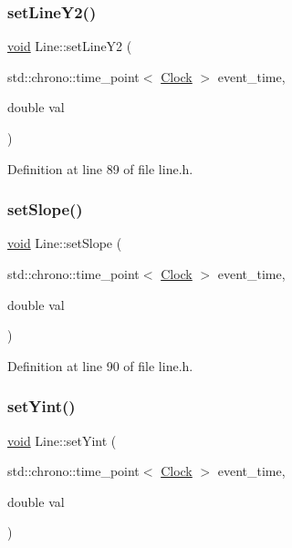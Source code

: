 \subsubsection{\texorpdfstring{set\+Line\+Y2()}{setLineY2()}}
{\footnotesize\ttfamily \mbox{\hyperlink{glad_8h_a950fc91edb4504f62f1c577bf4727c29}{void}} Line\+::set\+Line\+Y2 (\begin{DoxyParamCaption}\item[{std\+::chrono\+::time\+\_\+point$<$ \mbox{\hyperlink{universe_8h_a0ef8d951d1ca5ab3cfaf7ab4c7a6fd80}{Clock}} $>$}]{event\+\_\+time,  }\item[{double}]{val }\end{DoxyParamCaption})\hspace{0.3cm}{\ttfamily [inline]}}



Definition at line 89 of file line.\+h.

\mbox{\label{class_line_a3fb9e9eab13d146feff0bc891709eaf9}} 
\subsubsection{\texorpdfstring{set\+Slope()}{setSlope()}}
{\footnotesize\ttfamily \mbox{\hyperlink{glad_8h_a950fc91edb4504f62f1c577bf4727c29}{void}} Line\+::set\+Slope (\begin{DoxyParamCaption}\item[{std\+::chrono\+::time\+\_\+point$<$ \mbox{\hyperlink{universe_8h_a0ef8d951d1ca5ab3cfaf7ab4c7a6fd80}{Clock}} $>$}]{event\+\_\+time,  }\item[{double}]{val }\end{DoxyParamCaption})\hspace{0.3cm}{\ttfamily [inline]}}



Definition at line 90 of file line.\+h.

\mbox{\label{class_line_ad966eb3f1bd4cb29976b3e97811c344f}} 
\subsubsection{\texorpdfstring{set\+Yint()}{setYint()}}
{\footnotesize\ttfamily \mbox{\hyperlink{glad_8h_a950fc91edb4504f62f1c577bf4727c29}{void}} Line\+::set\+Yint (\begin{DoxyParamCaption}\item[{std\+::chrono\+::time\+\_\+point$<$ \mbox{\hyperlink{universe_8h_a0ef8d951d1ca5ab3cfaf7ab4c7a6fd80}{Clock}} $>$}]{event\+\_\+time,  }\item[{double}]{val }\end{DoxyParamCaption})\hspace{0.3cm}{\ttfamily [inline]}}



